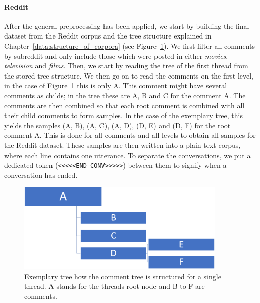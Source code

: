 \paragraph{Reddit} After the general preprocessing has been applied, we start by building the final dataset from the Reddit corpus and the tree structure explained in Chapter~\ref{data:structure_of_corpora} (see Figure~\ref{fig:data:reddit:utterance:construction}). We first filter all comments by subreddit and only include those which were posted in either \emph{movies}, \emph{television} and \emph{films}.  Then, we start by reading the tree of the first thread from the stored tree structure. We then go on to read the comments on the first level, in the case of Figure~\ref{fig:data:reddit:utterance:construction} this is only A. This comment might have several comments as childs; in the tree these are A, B and C for the comment A. The comments are then combined so that each root comment is combined with all their child comments to form samples. In the case of the exemplary tree, this yields the samples (A, B), (A, C), (A, D), (D, E) and (D, F) for the root comment A. This is done for all comments and all levels to obtain all samples for the Reddit dataset. These samples are then written into a plain text corpus, where each line contains one utterance. To separate the conversations, we put a dedicated token (\texttt{<<<<<END-CONV>>>>>}) between them to signify when a conversation has ended.
\\
\begin{figure}[H]
	\centering
	\includegraphics[width=10cm]{img/reddit_utterance_construction.PNG}
	\caption{Exemplary tree how the comment tree is structured for a single thread. A stands for the threads root node and B to F are comments.}
	\label{fig:data:reddit:utterance:construction}
\end{figure}


